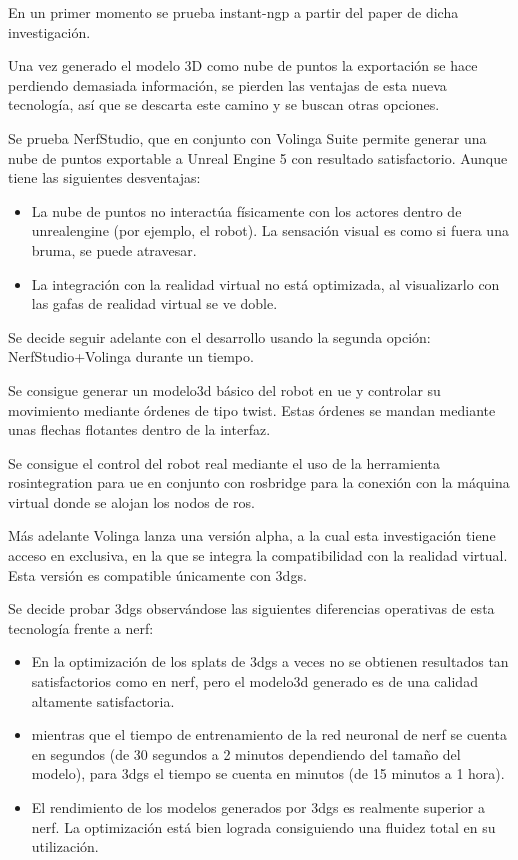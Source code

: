 \documentclass[a4paper, 12pt, spanish, twoside]{article}
\begin{document}
En un primer momento se prueba \gls{instant-ngp} a partir del paper de dicha investigación. 

Una vez generado el modelo 3D como nube de puntos la exportación se hace perdiendo demasiada información, se pierden las ventajas de esta nueva tecnología, así que se descarta este camino y se buscan otras opciones. 

Se prueba NerfStudio, que en conjunto con Volinga Suite permite generar una nube de puntos exportable a Unreal Engine 5 con resultado satisfactorio. Aunque tiene las siguientes desventajas: 

\begin{itemize} 
\item La nube de puntos no interactúa físicamente con los \gls{actores} dentro de \gls{unrealengine} (por ejemplo, el robot). La sensación visual es como si fuera una bruma, se puede atravesar. 

\item La integración con la realidad virtual no está optimizada, al visualizarlo con las gafas de realidad virtual se ve doble. 
\end{itemize} 

Se decide seguir adelante con el desarrollo usando la segunda opción: NerfStudio+Volinga durante un tiempo. 

Se consigue generar un \gls{modelo3d} básico del robot en \acrshort{ue} y controlar su movimiento mediante órdenes de tipo \gls{twist}. Estas órdenes se mandan mediante unas flechas flotantes dentro de la interfaz. 

Se consigue el control del robot real mediante el uso de la herramienta \gls{rosintegration} para \acrshort{ue} en conjunto con \gls{rosbridge} para la conexión con la máquina virtual donde se alojan los nodos de \acrshort{ros}. 

Más adelante Volinga lanza una versión alpha, a la cual esta investigación tiene acceso en exclusiva, en la que se integra la compatibilidad con la realidad virtual. Esta versión es compatible únicamente con \acrshort{3dgs}. 

Se decide probar \acrshort{3dgs} observándose las siguientes diferencias operativas de esta tecnología frente a \acrshort{nerf}: 

\begin{itemize}
\item En la optimización de los splats de \acrshort{3dgs} a veces no se obtienen resultados tan satisfactorios como en \acrshort{nerf}, pero el \gls{modelo3d} generado es de una calidad altamente satisfactoria. 

\item mientras que el tiempo de entrenamiento de la red neuronal de \acrshort{nerf} se cuenta en segundos (de 30 segundos a 2 minutos dependiendo del tamaño del modelo), para \acrshort{3dgs} el tiempo se cuenta en minutos (de 15 minutos a 1 hora). 

\item El rendimiento de los modelos generados por \acrshort{3dgs} es realmente superior a \gls{nerf}. La optimización está bien lograda consiguiendo una fluidez total en su utilización. 
\end{itemize} 
\end{document}
